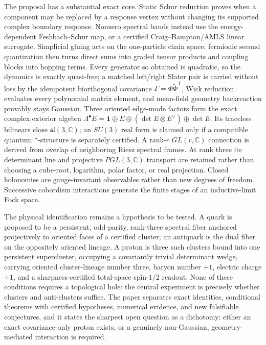 \documentclass[11pt,letterpaper]{article}
\begin{document}
\begin{titlepage}
\medskip
\noindent
The proposal has a substantial exact core. Static Schur reduction proves when a
component may be replaced by a response vertex without changing its supported
complex boundary response. Nonzero spectral bands instead use the
energy-dependent Feshbach--Schur map, or a certified Craig--Bampton/AMLS linear
surrogate. Simplicial gluing acts on the one-particle chain space; fermionic
second quantization then turns direct sums into graded tensor products and
coupling blocks into hopping terms. Every generator so obtained is quadratic,
so the dynamics is exactly quasi-free; a matched left/right Slater pair is
carried without loss by the idempotent biorthogonal covariance
$\Gamma=\Phi\widetilde\Phi^{\mathsf T}$, Wick reduction evaluates every
polynomial matrix element, and mean-field geometry backreaction provably stays
Gaussian. Three oriented edge-mode factors form the exact complex exterior
algebra
$\Lambda^{\bullet}E=\mathbf{1}\oplus E\oplus(\det E\otimes E^{\vee})
\oplus\det E$. Its traceless bilinears close $\mathfrak{sl}(3,\mathbb C)$;
an $SU(3)$ real form is claimed only if a compatible quantum $*$-structure is
separately certified. A rank-$r$ $GL(r,\mathbb C)$ connection is derived from
overlap of neighboring Riesz spectral frames. At rank three its determinant
line and projective $PGL(3,\mathbb C)$ transport are retained rather than
choosing a cube-root, logarithm, polar factor, or real projection. Closed
holonomies are gauge-invariant observables rather than new degrees of freedom.
Successive cobordism interactions generate the finite stages of an
inductive-limit Fock space.

\medskip
\noindent
The physical identification remains a hypothesis to be tested. A quark is
proposed to be a persistent, odd-parity, rank-three spectral fiber anchored
projectively to oriented faces of a certified cluster; an antiquark is the
dual fiber on the oppositely oriented lineage. A proton is three such clusters
bound into one persistent supercluster, occupying a covariantly trivial
determinant wedge, carrying oriented cluster-lineage number three, baryon
number $+1$, electric charge $+1$, and a sharpness-certified total-space
spin-$1/2$ readout. None of these conditions requires a topological hole: the
central experiment is precisely whether clusters and anti-clusters suffice.
The paper separates
exact identities, conditional theorems with certified hypotheses, numerical
evidence, and new falsifiable conjectures, and it states the sharpest open
question as a dichotomy: either an
exact covariance-only proton exists, or a genuinely non-Gaussian,
geometry-mediated interaction is required.
\endgroup
\end{titlepage}
\end{document}
